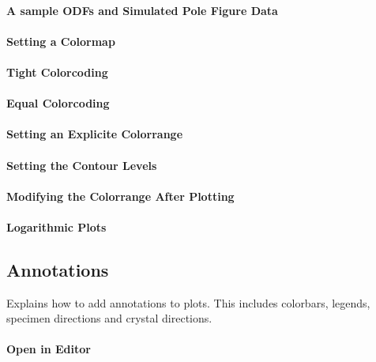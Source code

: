 \documentclass{article}
\begin{document}
			\paragraph{A sample ODFs and Simulated Pole Figure Data}
		
			\paragraph{Setting a Colormap}
		
			\paragraph{Tight Colorcoding}
		
			\paragraph{Equal Colorcoding}
		
			\paragraph{Setting an Explicite Colorrange}
		
			\paragraph{Setting the Contour Levels}
		
			\paragraph{Modifying the Colorrange After Plotting}
		
			\paragraph{Logarithmic Plots}
		
		\subsection{Annotations}

		
                     \begin{par}
Explains how to add annotations to plots. This includes colorbars, legends, specimen directions and crystal directions.
\end{par} \vspace{1em}

                  
			\paragraph{Open in Editor}
		
\end{document}
